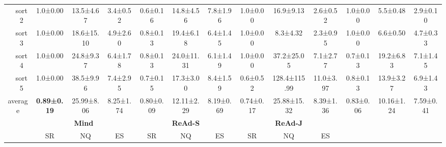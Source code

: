 \documentclass[11pt]{article}
\theoremstyle{plain}
\theoremstyle{remark}
\begin{document}
\begin{table}[t]
\begin{center}
\begin{small}
\begin{sc}
\begin{adjustbox}{width=1\textwidth}
\begin{tabular}{ccccccccccclll}
                          & \multicolumn{1}{c|}{sort2}   & 1.0±0.00  & 13.5±4.67  & \multicolumn{1}{c|}{3.4±0.52}  & 0.6±0.16  & 14.8±4.56  & \multicolumn{1}{c|}{7.8±1.96}  & 1.0±0.00  & 16.9±9.13    & \multicolumn{1}{c|}{2.6±0.52}  & \multicolumn{1}{c}{1.0±0.00}  & \multicolumn{1}{c}{5.5±0.48}   & \multicolumn{1}{c}{2.9±0.10}  \\
                          & \multicolumn{1}{c|}{sort3}   & 1.0±0.00  & 18.6±15.10 & \multicolumn{1}{c|}{4.9±2.60}  & 0.8±0.13  & 19.4±6.18  & \multicolumn{1}{c|}{6.4±1.45}  & 1.0±0.00  & 8.3±4.32     & \multicolumn{1}{c|}{2.3±0.95}  & \multicolumn{1}{c}{1.0±0.00}  & \multicolumn{1}{c}{6.6±0.50}   & \multicolumn{1}{c}{4.7±0.33}  \\
                          & \multicolumn{1}{c|}{sort4}   & 1.0±0.00  & 24.8±9.37  & \multicolumn{1}{c|}{6.4±1.78}  & 0.8±0.13  & 24.0±11.31 & \multicolumn{1}{c|}{6.1±1.49}  & 1.0±0.00  & 37.2±25.05   & \multicolumn{1}{c|}{7.1±2.77}  & \multicolumn{1}{c}{0.7±0.13}  & \multicolumn{1}{c}{19.2±6.83}  & \multicolumn{1}{c}{7.1±1.45}  \\
                          & \multicolumn{1}{c|}{sort5}   & 1.0±0.00  & 38.5±9.96  & \multicolumn{1}{c|}{7.4±2.95}  & 0.7±0.15  & 17.3±3.00  & \multicolumn{1}{c|}{8.4±1.59}  & 0.6±0.52  & 128.4±115.99 & \multicolumn{1}{c|}{11.0±3.97} & \multicolumn{1}{c}{0.8±0.13}  & \multicolumn{1}{c}{13.9±3.27}  & \multicolumn{1}{c}{6.9±1.43}  \\ \hline
\multicolumn{2}{c|}{average}                             & \textbf{0.89±0.19} & 25.99±8.06 & \multicolumn{1}{c|}{8.25±1.74} & 0.80±0.09 & 12.11±2.29 & \multicolumn{1}{c|}{8.19±0.69} & 0.74±0.17 & 25.88±15.32  & \multicolumn{1}{c|}{8.39±1.36} & \multicolumn{1}{c}{0.83±0.06} & \multicolumn{1}{c}{10.16±1.24} & \multicolumn{1}{c}{7.59±0.41} \\ \hline \hline
\multicolumn{1}{l}{}      & \multicolumn{1}{l}{}         & \multicolumn{3}{c|}{\textbf{Mind}}                               & \multicolumn{3}{c|}{\textbf{ReAd-S}}                             & \multicolumn{3}{c}{\textbf{ReAd-J}}                                &                               &                                &                               \\ \cline{1-11}
\multicolumn{1}{l}{}      & \multicolumn{1}{l|}{}        & SR        & NQ         & \multicolumn{1}{c|}{ES}        & SR        & NQ         & \multicolumn{1}{c|}{ES}        & SR        & NQ           & ES                             &                               &                                &                               \\ \cline{1-11}

\end{tabular}
\end{adjustbox}
\end{sc}
\end{small}
\end{center}
\end{table}
\end{document}
